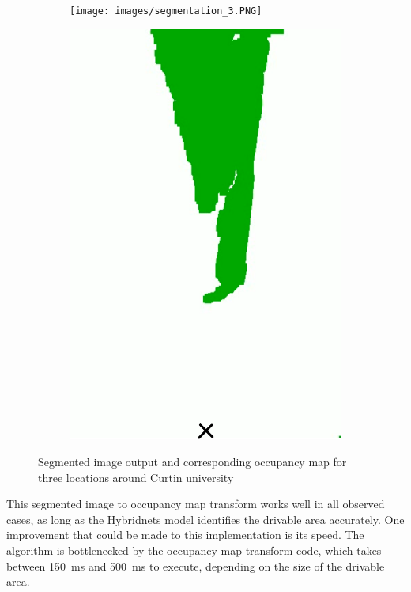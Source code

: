 \begin{figure}[H]
\begin{subfigure}{.2\textwidth}
    \end{subfigure}
    \smallskip
    \begin{subfigure}{.55\textwidth}
        \centering
        \texttt{[image: images/segmentation\_3.PNG]}
    \end{subfigure}
    \quad
    \begin{subfigure}{.2\textwidth}
        \centering
        \includegraphics[width=\linewidth]{images/occupancy_map3.png}
    \end{subfigure}
    \caption{Segmented image output and corresponding occupancy map for three locations around Curtin university}
    \label{fig:occupancy_map_seg}
\end{figure}
\pagebreak

This segmented image to occupancy map transform works well in all observed cases, as long as the Hybridnets model identifies the
drivable area accurately. One improvement that could be made to this implementation is its speed.
The algorithm is bottlenecked by the occupancy map transform code, which takes between \SI{150}{\milli\second}
and \SI{500}{\milli\second} to execute, depending on the size of the drivable area.

